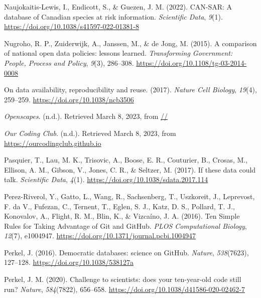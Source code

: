 \begin{CSLReferences}{1}{0}
\leavevmode{}%
Naujokaitis-Lewis, I., Endicott, S., \& Guezen, J. M. (2022). CAN-SAR: A database of Canadian species at risk information. \emph{Scientific Data}, \emph{9}(1). \url{https://doi.org/10.1038/s41597-022-01381-8}

\leavevmode{}%
Nugroho, R. P., Zuiderwijk, A., Janssen, M., \& de Jong, M. (2015). A comparison of national open data policies: lessons learned. \emph{Transforming Government: People, Process and Policy}, \emph{9}(3), 286--308. \url{https://doi.org/10.1108/tg-03-2014-0008}

\leavevmode{}%
On data availability, reproducibility and reuse. (2017). \emph{Nature Cell Biology}, \emph{19}(4), 259--259. \url{https://doi.org/10.1038/ncb3506}

\leavevmode{}%
\emph{Openscapes}. (n.d.). Retrieved March 8, 2023, from \href{https:////}{//}

\leavevmode{}%
\emph{Our Coding Club}. (n.d.). Retrieved March 8, 2023, from \url{https://ourcodingclub.github.io}

\leavevmode{}%
Pasquier, T., Lau, M. K., Trisovic, A., Boose, E. R., Couturier, B., Crosas, M., Ellison, A. M., Gibson, V., Jones, C. R., \& Seltzer, M. (2017). If these data could talk. \emph{Scientific Data}, \emph{4}(1). \url{https://doi.org/10.1038/sdata.2017.114}

\leavevmode{}%
Perez-Riverol, Y., Gatto, L., Wang, R., Sachsenberg, T., Uszkoreit, J., Leprevost, F. da V., Fufezan, C., Ternent, T., Eglen, S. J., Katz, D. S., Pollard, T. J., Konovalov, A., Flight, R. M., Blin, K., \& Vizcaíno, J. A. (2016). Ten Simple Rules for Taking Advantage of Git and GitHub. \emph{PLOS Computational Biology}, \emph{12}(7), e1004947. \url{https://doi.org/10.1371/journal.pcbi.1004947}

\leavevmode{}%
Perkel, J. (2016). Democratic databases: science on GitHub. \emph{Nature}, \emph{538}(7623), 127--128. \url{https://doi.org/10.1038/538127a}

\leavevmode{}%
Perkel, J. M. (2020). Challenge to scientists: does your ten-year-old code still run? \emph{Nature}, \emph{584}(7822), 656--658. \url{https://doi.org/10.1038/d41586-020-02462-7}


\end{CSLReferences}

